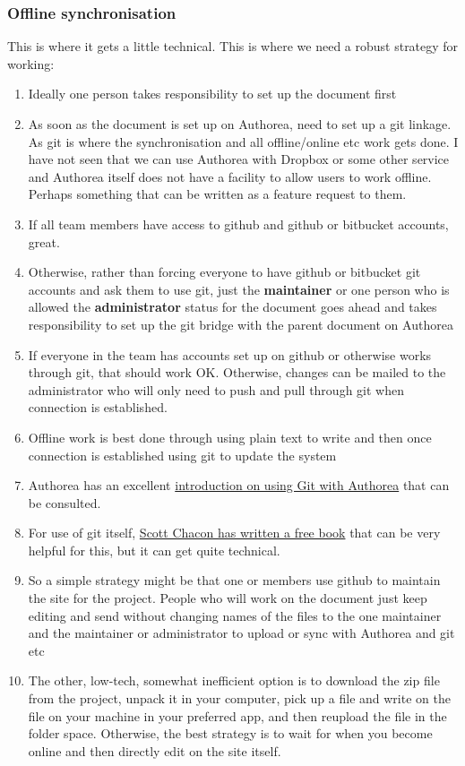 \subsubsection{Offline synchronisation}

This is where it gets a little technical. This is where we need a robust strategy for working:

\begin{enumerate}
\item Ideally one person takes responsibility to set up the document first
\item As soon as the document is set up on Authorea, need to set up a git linkage. As git is where the synchronisation and all offline/online etc work gets done. I have not seen that we can use Authorea with Dropbox or some other service and Authorea itself does not have a facility to allow users to work offline. Perhaps something that can be written as a feature request to them.
\item If all team members have access to github and github or bitbucket accounts, great. 
\item Otherwise, rather than forcing everyone to have github or bitbucket git accounts and ask them to use git, just the \textbf{maintainer} or one person who is allowed the \textbf{administrator} status for the document goes ahead and takes responsibility to set up the git bridge with the parent document on Authorea
\item If everyone in the team has accounts set up on github or otherwise works through git, that should work OK. Otherwise, changes can be mailed to the administrator who will only need to push and pull through git when connection is established.
\item Offline work is best done through using plain text to write and then once connection is established using git to update the system
\item Authorea has an excellent \href{https://www.authorea.com/users/3/articles/17235/_show_article}{introduction on using Git with Authorea} that can be consulted.
\item For use of git itself, \href{https://git-scm.com/book/en/v2/Getting-Started-Git-Basics}{Scott Chacon has written a free book} that can be very helpful for this, but it can get quite technical. 
\item So a simple strategy might be that one or members use github to maintain the site for the project. People who will work on the document just keep editing and send without changing names of the files to the one maintainer and the maintainer or administrator to upload or sync with Authorea and git etc
\item The other, low-tech, somewhat inefficient option is to download the zip file from the project, unpack it in your computer, pick up a file and write on the file on your machine in your preferred app, and then reupload the file in the folder space. Otherwise, the best strategy is to wait for when you become online and then directly edit on the site itself. 
\end{enumerate}

